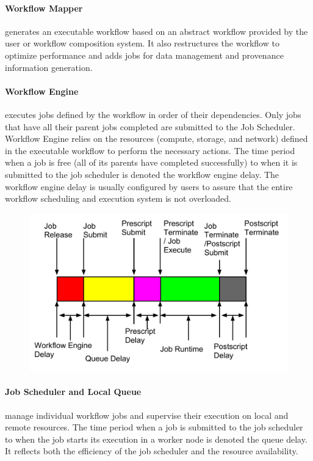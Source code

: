 \documentclass[final]{IEEEtran}
\begin{document}
\paragraph{Workflow Mapper} generates an executable workflow based on an abstract workflow provided by the user or workflow composition system. It also restructures the workflow to optimize performance and adds jobs for data management and provenance information generation. 

\paragraph{Workflow Engine} executes jobs defined by the workflow in order of their dependencies. Only jobs that have all their parent jobs completed are submitted to the Job Scheduler. Workflow Engine relies on the resources (compute, storage, and network) defined in the executable workflow to perform the necessary actions. The time period when a job is free (all of its parents have completed successfully) to when it is submitted to the job scheduler is denoted the workflow engine delay. The workflow engine delay is usually configured by users to assure that the entire workflow scheduling and execution system is not overloaded. 

\begin{figure}[htb]
\centering
 \includegraphics[width=1\linewidth]{figure/timeline.pdf}
  \label{fig:overhead}
  \vspace{-10pt}
\end{figure}

\paragraph{Job Scheduler and Local Queue} manage individual workflow jobs and supervise their execution on local and remote resources. The time period when a job is submitted to the job scheduler to when the job starts its execution in a worker node is denoted the queue delay. It reflects both the efficiency of the job scheduler and the resource availability. 
\end{document}
